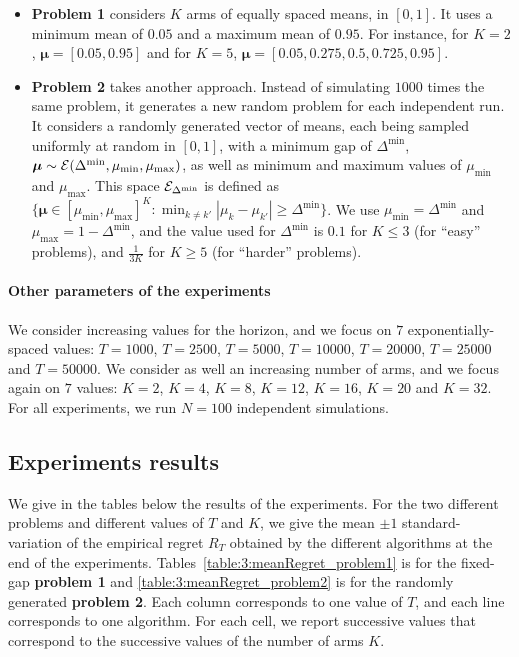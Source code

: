 \begin{itemize}
    \item \textbf{Problem 1} considers $K$ arms of equally spaced means, in $[0,1]$.
    It uses a minimum mean of $0.05$ and a maximum mean of $0.95$.
    For instance, for $K=2$, $\bm{\mu}=[0.05, 0.95]$ and for $K=5$, $\bm{\mu} = [0.05, 0.275, 0.5, 0.725, 0.95]$.

    \item \textbf{Problem 2} takes another approach. Instead of simulating $1000$ times the same problem, it generates a new random problem for each independent run.
    It considers a randomly generated vector of means, each being sampled uniformly at random in $[0,1]$, with a minimum gap of $\Delta^{\min}$, $\bm{\mu} \sim \mathcal{E}(\Delta^{\min},\mu_{\min},\mu_{\max})$, as well as minimum and maximum values of $\mu_{\min}$ and $\mu_{\max}$.
    This space $\mathcal{E}_{\Delta^{\min}}$ is defined as $\{ \bm{\mu} \in [\mu_{\min}, \mu_{\max}]^K : \min_{k\neq k'} |\mu_k - \mu_{k'}| \geq \Delta^{\min} \}$.
    We use $\mu_{\min} = \Delta^{\min}$ and $\mu_{\max} = 1 - \Delta^{\min}$,
    and the value used for $\Delta^{\min}$ is $0.1$ for $K \leq 3$ (for ``easy'' problems), and $\frac{1}{3 K}$ for $K \geq 5$ (for ``harder'' problems).
\end{itemize}


\paragraph{Other parameters of the experiments}

We consider increasing values for the horizon, and we focus on $7$ exponentially-spaced values: $T=1000$, $T=2500$, $T=5000$, $T=10000$, $T=20000$, $T=25000$ and $T=50000$.
We consider as well an increasing number of arms, and we focus again on $7$ values: $K=2$, $K=4$, $K=8$, $K=12$, $K=16$, $K=20$ and $K=32$.
For all experiments, we run $N=100$ independent simulations.


\subsection{Experiments results}

We give in the tables below the results of the experiments. For the two different problems and different values of $T$ and $K$, we give the mean $\pm 1$ standard-variation of the empirical regret $R_T$ obtained by the different algorithms at the end of the experiments.
Tables~\ref{table:3:meanRegret_problem1} is for the fixed-gap \textbf{problem 1}
and \ref{table:3:meanRegret_problem2} is for the randomly generated \textbf{problem 2}.
Each column corresponds to one value of $T$, and each line corresponds to one algorithm.
For each cell, we report successive values that correspond to the successive values of the number of arms $K$.


